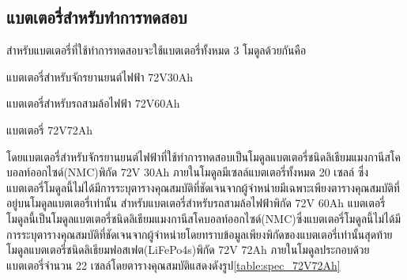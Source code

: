 \subsection{แบตเตอรี่สำหรับทำการทดสอบ}
สำหรับแบตเตอรี่ที่ใช้ทำการทดสอบจะใช้แบตเตอรี่ทั้งหมด 3 โมดูลด้วยกันคือ
\begin{itemize}
 {\item แบตเตอรี่สำหรับจักรยานยนต์ไฟฟ้า 72V30Ah}
 {\item แบตเตอรี่สำหรับรถสามล้อไฟฟ้า 72V60Ah}
 {\item แบตเตอรี่ 72V72Ah}
\end{itemize}
โดยแบตเตอรี่สำหรับจักรยานยนต์ไฟฟ้าที่ใช้ทำการทดสอบเป็นโมดูลแบตเตอรี่ชนิดลิเธียมแมงกานีสโคบอลท์ออกไซด์(NMC)พิกัด 72V 30Ah ภายในโมดูลมีเซลล์แบตเตอรี่ทั้งหมด 20 เซลล์ ซึ่งแบตเตอรี่โมดูลนี้ไม่ได้มีการระบุตารางคุณสมบัติที่ชัดเจนจากผู้จำหน่ายมีเฉพาะเพียงตารางคุณสมบัติที่อยู่บนโมดูลแบตเตอรี่เท่านั้น สำหรับแบตเตอรี่สำหรับรถสามล้อไฟฟ้าพิกัด 72V 60Ah แบตเตอรี่โมดูลนี้เป็นโมดูลแบตเตอรี่ชนิดลิเธียมแมงกานีสโคบอลท์ออกไซด์(NMC)ซึ่งแบตเตอรี่โมดูลนี้ไม่ได้มีการระบุตารางคุณสมบัติที่ชัดเจนจากผู้จำหน่ายโดยทราบข้อมูลเพียงพิกัดของแบตเตอรี่เท่านั้นสุดท้าย
โมดูลแบตเตอรี่ชนิดลิเธียมฟอสเฟต(LiFePo4s)พิกัด 72V 72Ah ภายในโมดูลประกอบด้วยแบตเตอรี่จำนวน 22 เซลล์โดยตารางคุณสมบัติแสดงดังรูป\ref{table:spec_72V72Ah}

